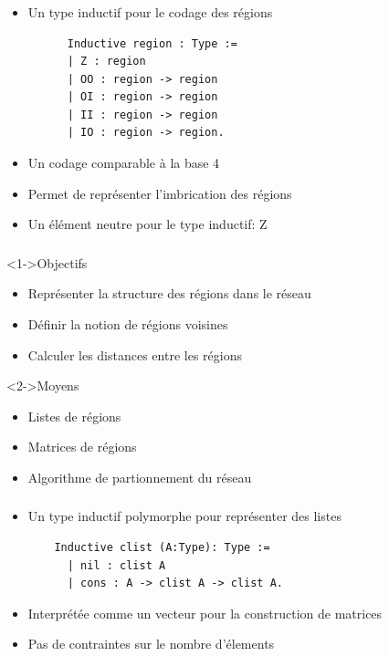 \documentclass[handout]{beamer}
\begin{document}
\begin{frame}[fragile]
  \frametitle<1->{}
    \begin{itemize}
    \item <1->{Un type inductif pour le codage des régions}
      \begin{lstlisting}
      Inductive region : Type :=
      | Z : region
      | OO : region -> region
      | OI : region -> region
      | II : region -> region
      | IO : region -> region.
      \end{lstlisting}
    \item <2->{Un codage comparable à la base 4}
    \item <3->{Permet de représenter l'imbrication des régions}%
    \item <4->{Un élément neutre pour le type inductif: Z}
    \end{itemize}
\end{frame}

\begin{frame}
  \frametitle<1->{}
    \begin{block}<1->{Objectifs}
    \begin{itemize}
    \item <1->{Représenter la structure des régions dans le réseau}
    \item <2->{Définir la notion de régions voisines}
    \item <3->{Calculer les distances entre les régions}
    \end{itemize}
  \end{block}
  \begin{block}<2->{Moyens}
    \begin{itemize}
    \item <4->{Listes de régions}
    \item <5->{Matrices de régions}
    \item <6->{Algorithme de partionnement du réseau}
    \end{itemize}
  \end{block}
\end{frame}

\begin{frame}[fragile]
  \frametitle<1->{}

    \begin{itemize}
    \item <1->{Un type inductif polymorphe pour représenter des listes}
    \begin{lstlisting}
    Inductive clist (A:Type): Type :=
      | nil : clist A
      | cons : A -> clist A -> clist A.
    \end{lstlisting}
    \item <2->{Interprétée comme un vecteur pour la construction de matrices}
    \item <2->{Pas de contraintes sur le nombre d'élements}
    \end{itemize}
\end{frame}
\end{document}
